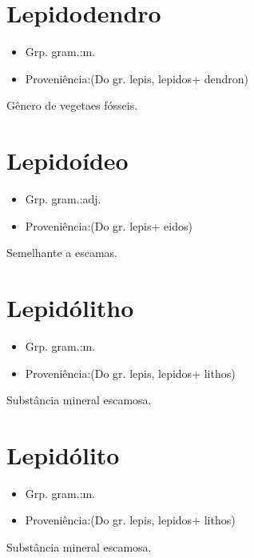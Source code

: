 \section{Lepidodendro}
\begin{itemize}
\item {Grp. gram.:m.}
\end{itemize}
\begin{itemize}
\item {Proveniência:(Do gr. \textunderscore lepis\textunderscore , \textunderscore lepidos\textunderscore  + \textunderscore dendron\textunderscore )}
\end{itemize}
Gênero de vegetaes fósseis.
\section{Lepidoídeo}
\begin{itemize}
\item {Grp. gram.:adj.}
\end{itemize}
\begin{itemize}
\item {Proveniência:(Do gr. \textunderscore lepis\textunderscore  + \textunderscore eidos\textunderscore )}
\end{itemize}
Semelhante a escamas.
\section{Lepidólitho}
\begin{itemize}
\item {Grp. gram.:m.}
\end{itemize}
\begin{itemize}
\item {Proveniência:(Do gr. \textunderscore lepis\textunderscore , \textunderscore lepidos\textunderscore  + \textunderscore lithos\textunderscore )}
\end{itemize}
Substância mineral escamosa.
\section{Lepidólito}
\begin{itemize}
\item {Grp. gram.:m.}
\end{itemize}
\begin{itemize}
\item {Proveniência:(Do gr. \textunderscore lepis\textunderscore , \textunderscore lepidos\textunderscore  + \textunderscore lithos\textunderscore )}
\end{itemize}
Substância mineral escamosa.
